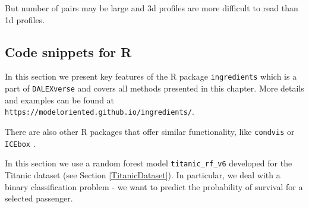 \documentclass[12pt,]{krantz}
\newenvironment{Shaded}{\begin{snugshade}}{\end{snugshade}}
\newcommand{\DataTypeTok}[1]{\textcolor[rgb]{0.13,0.29,0.53}{#1}}
\newcommand{\DecValTok}[1]{\textcolor[rgb]{0.00,0.00,0.81}{#1}}
\newcommand{\KeywordTok}[1]{\textcolor[rgb]{0.13,0.29,0.53}{\textbf{#1}}}
\newcommand{\NormalTok}[1]{#1}
\newcommand{\OperatorTok}[1]{\textcolor[rgb]{0.81,0.36,0.00}{\textbf{#1}}}
\newcommand{\StringTok}[1]{\textcolor[rgb]{0.31,0.60,0.02}{#1}}
\theoremstyle{definition}
\theoremstyle{definition}
\theoremstyle{definition}
\theoremstyle{remark}
\begin{document}
But number of pairs may be large and 3d profiles are more difficult to
read than 1d profiles.

\hypertarget{code-snippets-for-r-2}{%
\subsection{Code snippets for R}\label{code-snippets-for-r-2}}

In this section we present key features of the R package
\texttt{ingredients} \citep{ingredientsRPackage} which is a part of
\texttt{DALEXverse} and covers all methods presented in this chapter.
More details and examples can be found at
\texttt{https://modeloriented.github.io/ingredients/}.

There are also other R packages that offer similar functionality, like
\texttt{condvis} \citep{JSSv081i05} or \texttt{ICEbox}
\citep{ICEboxRPackage}.

In this section we use a random forest \citep{R-randomForest} model
\texttt{titanic\_rf\_v6} developed for the Titanic dataset (see Section
\ref{TitanicDataset}). In particular, we deal with a binary
classification problem - we want to predict the probability of survival
for a selected passenger.

\begin{Shaded}
\end{Shaded}
\end{document}
